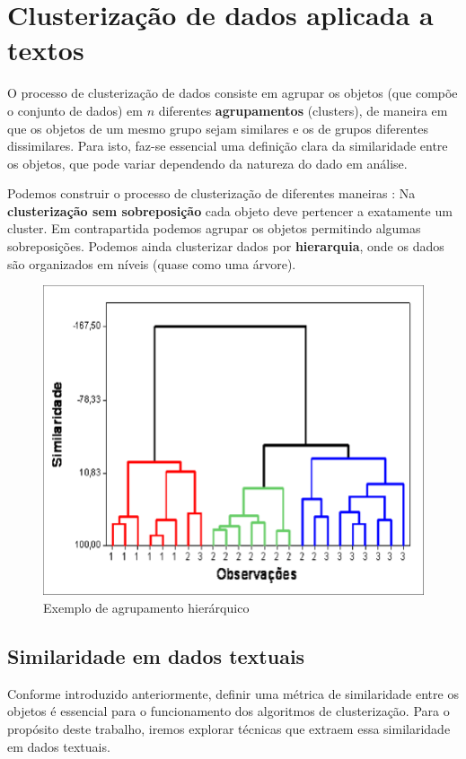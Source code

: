  \chapter{Clusterização de dados aplicada a textos}\label{cap:clus}
 
 O processo de clusterização de dados consiste em agrupar os objetos (que compõe o conjunto de dados) em $n$ diferentes \textbf{agrupamentos} (clusters), de maneira em que os objetos de um mesmo grupo sejam similares e os de grupos diferentes dissimilares.
 Para isto, faz-se essencial uma definição clara da similaridade entre os objetos, que pode variar dependendo da natureza do dado em análise.
 
 Podemos construir o processo de clusterização de diferentes maneiras \cite{Goog2}: Na \textbf{clusterização sem sobreposição} cada objeto deve pertencer a exatamente um cluster. 
 Em contrapartida podemos agrupar os objetos permitindo algumas sobreposições. 
 Podemos ainda clusterizar dados por \textbf{hierarquia}, onde os dados são organizados em níveis (quase como uma árvore).
 
 \begin{figure}[H]
   \centering
   \includegraphics[scale=0.50]{figs/cluster_h.png}
    \caption{Exemplo de agrupamento hierárquico}
    \label{fig:clusterh}
 \end{figure}
 
 \pagebreak
 
 \section{Similaridade em dados textuais}
 Conforme introduzido anteriormente, definir uma métrica de similaridade entre os objetos é essencial para o funcionamento dos algoritmos de clusterização.
 Para o propósito deste trabalho, iremos explorar técnicas que extraem essa similaridade em dados textuais.
 
